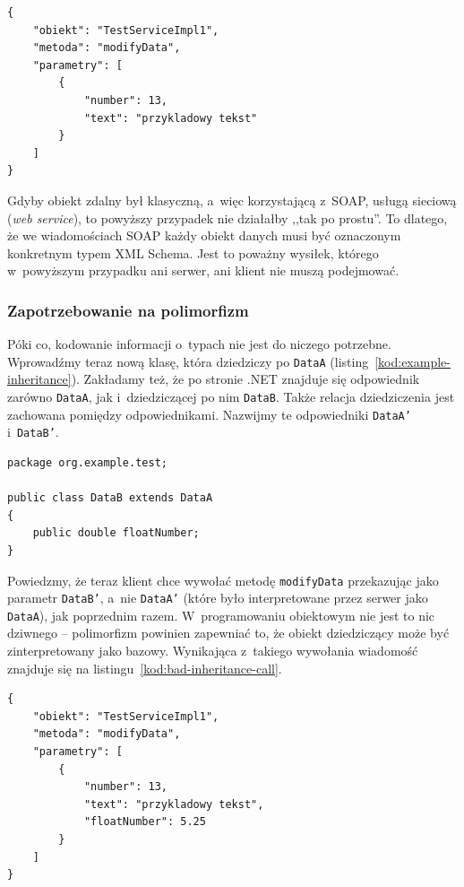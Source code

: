 \begin{lstlisting}[frame=single, float, caption={Przykład wiadomości JSON wywołującej metodę zdalną.}, label=kod:example-call]
{
    "obiekt": "TestServiceImpl1",
    "metoda": "modifyData",
    "parametry": [
        {
            "number": 13,
            "text": "przykladowy tekst"
        }
    ]
}
\end{lstlisting}

Gdyby obiekt zdalny był klasyczną, a~więc korzystającą z~SOAP, usługą sieciową (\emph{web service}), to powyższy przypadek nie działałby ,,tak po prostu''.
To dlatego, że we wiadomościach SOAP każdy obiekt danych musi być oznaczonym konkretnym typem XML Schema.
Jest to poważny wysiłek, którego w~powyższym przypadku ani serwer, ani klient nie muszą podejmować.

\subsubsection{Zapotrzebowanie na polimorfizm}
\label{need-for-polymorphism}
Póki co, kodowanie informacji o~typach nie jest do niczego potrzebne. Wprowadźmy teraz nową klasę, która dziedziczy po \texttt{DataA} (listing~\ref{kod:example-inheritance}).
Zakładamy też, że po stronie .NET znajduje się odpowiednik zarówno \texttt{DataA}, jak i~dziedziczącej po nim \texttt{DataB}. Także relacja dziedziczenia jest zachowana pomiędzy odpowiednikami. Nazwijmy te odpowiedniki \texttt{DataA'} i~\texttt{DataB'}.

\begin{lstlisting}[frame=single, float, caption={Klasa danych dziedzicząca po innej klasie danych.}, label=kod:example-inheritance]
package org.example.test;

public class DataB extends DataA
{
    public double floatNumber;
}
\end{lstlisting}

Powiedzmy, że teraz klient chce wywołać metodę \texttt{modifyData} przekazując jako parametr \texttt{DataB'}, a~nie \texttt{DataA'} (które było interpretowane przez serwer jako \texttt{DataA}), jak poprzednim razem.
W~programowaniu obiektowym nie jest to nic dziwnego -- polimorfizm powinien zapewniać to, że obiekt dziedziczący może być zinterpretowany jako bazowy.
Wynikająca z~takiego wywołania wiadomość znajduje się na listingu~\ref{kod:bad-inheritance-call}.

\begin{lstlisting}[frame=single, float, caption={Wywołanie zawierające parametr dziedziczący po parametrze spodziewanym.}, label=kod:bad-inheritance-call]
{
    "obiekt": "TestServiceImpl1",
    "metoda": "modifyData",
    "parametry": [
        {
            "number": 13,
            "text": "przykladowy tekst",
            "floatNumber": 5.25
        }
    ]
}
\end{lstlisting}

